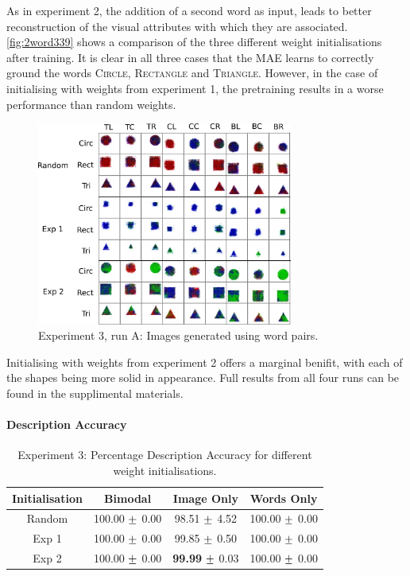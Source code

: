 As in experiment 2, the addition of a second word as input, leads to better reconstruction of the visual attributes with which they are associated. \autoref{fig:2word339} shows a comparison of the three different weight initialisations after training. It is clear in all three cases that the \ac{MAE} learns to correctly ground the words \textsc{Circle}, \textsc{Rectangle} and \textsc{Triangle}. However, in the case of initialising with weights from experiment 1, the pretraining results in a worse performance than random weights.
\begin{figure}[h]
\centering
\includegraphics[width=0.75\textwidth]{Figs/shapes/2word339_pos.png}
\caption{Experiment 3, run A: Images generated using word pairs.}
\label{fig:2word339}
\end{figure}

Initialising with weights from experiment 2 offers a marginal benifit, with each of the shapes being more solid in appearance. Full results from all four runs can be found in the supplimental materials.

\paragraph{Description Accuracy}

\begin{table}[h!]
\centering
	\begin{tabular}{|c|c|c|c|}
	\hline
	\textbf{Initialisation} & 	\textbf{Bimodal} & 	\textbf{Image Only} 	& 	\textbf{Words Only} \\ \hline
	Random	&	100.00	$\mypm$	0.00	&	98.51	$\mypm$	4.52	&	100.00	$\mypm$	0.00	\\ \hline
	Exp 1	&	100.00	$\mypm$	0.00	&	99.85	$\mypm$	0.50	&	100.00	$\mypm$	0.00	\\ \hline
	Exp 2	&	100.00	$\mypm$	0.00	&	\textbf{99.99}	$\mypm$ 0.03	&	100.00	$\mypm$	0.00	\\ \hline



	\end{tabular}
\caption{Experiment 3: Percentage Description Accuracy for different weight initialisations. }
\label{tab:res339_acc}
\end{table}

